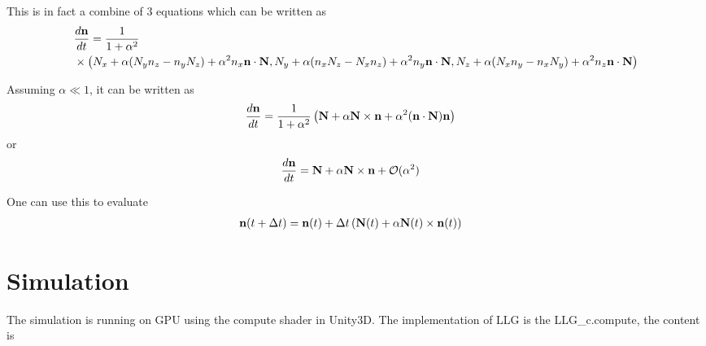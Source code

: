 \documentclass[aps,superscriptaddress,groupedaddress]{revtex4}  %
\begin{document}
This is in fact a combine of $3$ equations which can be written as
\begin{equation}
\begin{split}
&\frac{d{\bf n}}{dt}=\frac{1}{1+\alpha ^2}\\
&\times \left(N_x+\alpha(N_yn_z-n_yN_z)+\alpha^2 n_x {\bf n}\cdot {\bf N},N_y+\alpha (n_xN_z-N_xn_z)+\alpha^2n_y{\bf n}\cdot {\bf N},N_z+\alpha(N_xn_y-n_xN_y)+\alpha^2 n_z{\bf n}\cdot {\bf N}\right)
\end{split}
\end{equation}

Assuming $\alpha \ll 1$, it can be written as
\begin{equation}
\begin{split}
&\frac{d{\bf n}}{dt}=\frac{1}{1+\alpha^2}\left({\bf N}+\alpha {\bf N}\times {\bf n}+\alpha ^2 ({\bf n}\cdot {\bf N}){\bf n}\right)
\end{split}
\end{equation}
or
\begin{equation}
\begin{split}
&\frac{d{\bf n}}{dt}={\bf N}+\alpha {\bf N}\times {\bf n}+\mathcal{O}(\alpha ^2)
\end{split}
\end{equation}

One can use this to evaluate
\begin{equation}
\begin{split}
&{\bf n}(t+\Delta t)={\bf n}(t)+\Delta t \left({\bf N}(t)+\alpha {\bf N}(t)\times {\bf n}(t)\right)
\end{split}
\end{equation}

\section{\label{sec:4}Simulation}

The simulation is running on GPU using the compute shader in Unity3D. The implementation of LLG is the LLG\_c.compute, the content is

\end{document}
